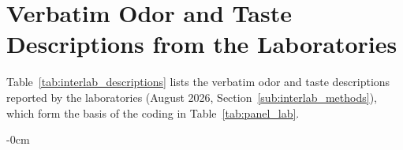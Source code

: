 \documentclass[foods,article,submit,moreauthors]{Definitions/mdpi}
\begin{document}
\appendixstart
\appendix
\section[\appendixname~\thesection]{Verbatim Odor and Taste Descriptions from the Laboratories}
\label{app:interlab_raw}

Table~\ref{tab:interlab_descriptions} lists the verbatim odor and taste
descriptions reported by the laboratories (August 2026,
Section~\ref{sub:interlab_methods}), which form the basis of the coding in
Table~\ref{tab:panel_lab}.



\begin{adjustwidth}{-\extralength}{0cm}



\PublishersNote{}
\end{adjustwidth}
\end{document}
